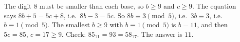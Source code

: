 The digit $8$ must be smaller than each base, so $b\ge9$ and $c\ge9$. The equation says $8b+5=5c+8$, i.e.\ $8b-3=5c$. So $8b\equiv3\pmod5$, i.e.\ $3b\equiv3$, i.e.\ $b\equiv1\pmod5$. The smallest $b\ge9$ with $b\equiv1\pmod5$ is $b=11$, and then $5c=85$, $c=17\ge9$. Check: $85_{11}=93=58_{17}$. The answer is $\boxed{11}$.
